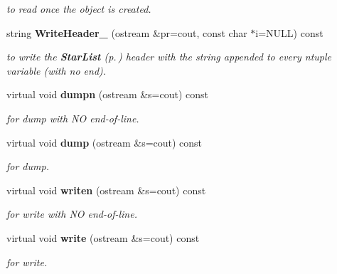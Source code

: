 \begin{CompactItemize}
\begin{CompactList}\small\item\em to read once the object is created.\item\end{CompactList}\item 
{}
string {\bf Write\-Header\_\-} (ostream \&pr=cout, const char $\ast$i=NULL) const\label{class_jimstar_a11}

\begin{CompactList}\small\item\em to write the {\bf Star\-List} {\rm (p.\,\pageref{class_starlist})} header with the string appended to every ntuple variable (with no end).\item\end{CompactList}\item 
{}
virtual void {\bf dumpn} (ostream \&s=cout) const\label{class_jimstar_a12}

\begin{CompactList}\small\item\em for dump with NO end-of-line.\item\end{CompactList}\item 
{}
virtual void {\bf dump} (ostream \&s=cout) const\label{class_jimstar_a13}

\begin{CompactList}\small\item\em for dump.\item\end{CompactList}\item 
{}
virtual void {\bf writen} (ostream \&s=cout) const\label{class_jimstar_a14}

\begin{CompactList}\small\item\em for write with NO end-of-line.\item\end{CompactList}\item 
{}
virtual void {\bf write} (ostream \&s=cout) const\label{class_jimstar_a15}

\begin{CompactList}\small\item\em for write.\item\end{CompactList}\end{CompactItemize}
